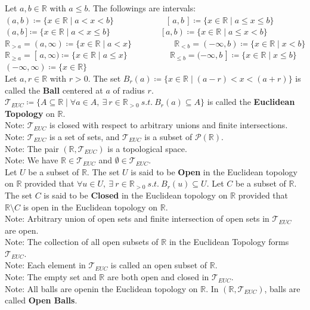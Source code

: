 \documentclass[11pt]{article}
\newcommand{\R}{\mathbb{R}}
\newcommand{\T}{\mathcal{T}}
\newcommand{\note}{\color{gray}Note: \color{black}}
\begin{document}
		\noindent Let $a,b \in \R$ with $a \leq b$. The followings are intervals:\\
		$(a,b) \coloneqq \{x \in \R \mid a<x<b \} \ \ \ \ \ \ \ \ \ \ \ \ \ \ \ \ \ \ \ \ \ \ \ \ \ \ \ \ [ \, a,b \, ] \coloneqq \{x \in \R \mid a\leq x\leq b \}$\\
		$\left( a,b \, ] \coloneqq \{x \in \R \mid a<x\leq b \} \ \ \ \ \ \ \ \ \ \ \ \ \ \ \ \ \ \ \ \ \ \ \ \ \ \ \ \ [ \, a,b \right) \coloneqq \{x \in \R \mid a\leq x<b \}$\\
		$\R_{>a}=(a,\infty) \coloneqq \{x \in \R \mid a<x \}  \ \ \ \ \ \ \ \ \ \ \ \ \ \ \ \ \ \ \ \ \ \ \ \R_{<b}=(-\infty,b) \coloneqq \{x \in \R \mid x< b \}$\\					$\R_{\geq a}=[\, a,\infty) \coloneqq \{x \in \R \mid a\leq x \}  \ \ \ \ \ \ \ \ \ \ \ \ \ \ \ \ \ \ \ \ \ \ \ \R_{\leq b}=(-\infty,b \, ] \coloneqq \{x \in \R \mid x\leq b \}$\\
		$(-\infty ,\infty )\coloneqq \{ x \in \R \}$\\
		
		\noindent Let $a,r \in \R$ with $r>0$. The set $B_r(a) \coloneqq \{ x \in \R \mid (a-r)<x<(a+r) \}$ is called the \textbf{Ball} centered at $a$ of radius $r$.\\

		\noindent $\T_{EUC} \coloneqq \{ A \subseteq \R \mid \forall a \in A,\ \exists \ r \in \R_{>0} \ s.t. \  B_r(a) \subseteq A\}$ is called the \textbf{Euclidean Topology} on $\R$.\\
		\note $\T_{EUC}$ is closed with respect to arbitrary unions and finite intersections.\\
		\note $\T_{EUC}$ is a set of sets, and $\T_{EUC}$ is a subset of $\mathcal{P} (\R )$.\\
		\note The pair $(\R, \T_{EUC})$ is a topological space.\\
		\note We have $\R \in \T_{EUC}$ and $\emptyset \in \T_{EUC}$.\\		
		
		\noindent Let $U$ be a subset of $\R$. The set $U$ is said to be \textbf{Open} in the Euclidean topology on $\R$ provided that $\forall u \in U,  \ \exists \ r \in \R_{>0}  \ s.t. \ B_r(u)\subseteq U$. Let $C$ be a subset of $\R$. The set $C$ is said to be \textbf{Closed} in the Euclidean topology on $\R$ provided that $\R \setminus C$ is open in the Euclidean topology on $\R$.\\
		\note Arbitrary union of open sets and finite intersection of open sets in $\T_{EUC}$ are open.\\
		\note The collection of all open subsets of $\R$ in the Euclidean Topology forms $\T_{EUC}$.\\
		\note Each element in $\T_{EUC}$ is called an open subset of $\R$.\\
		\note The empty set and $\R$ are both open and closed in $\T_{EUC}$.\\ 
		\note All balls are openin the Euclidean topology on $\R$. In  $(\R,\T_{EUC})$, balls are called \textbf{Open Balls}.\\
\end{document}
